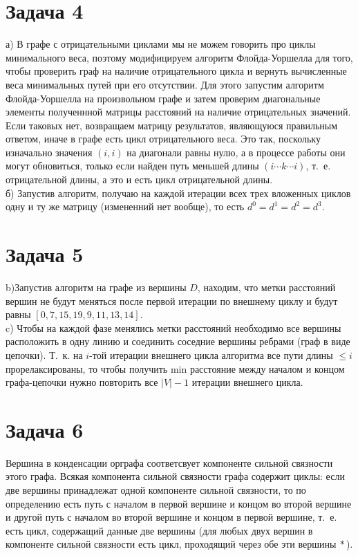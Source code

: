 \documentclass[a4paper,12pt]{article} %
\begin{document}
\section*{Задача 4}
а) В графе с отрицательными циклами мы не можем говорить про циклы минимального веса, поэтому модифицируем алгоритм Флойда-Уоршелла для того, чтобы проверить граф на наличие отрицательного цикла и вернуть вычисленные веса минимальных путей при его отсутствии. Для этого запустим алгоритм Флойда-Уоршелла на произвольном графе и затем проверим диагональные элементы полученнной матрицы расстояний на наличие отрицательных значений. Если таковых нет, возвращаем матрицу результатов, являющуюся правильным ответом, иначе в графе есть цикл отрицательного веса. Это так, поскольку изначально значения $(i, i)$ на диагонали равны нулю, а в процессе работы они могут обновиться, только если найден путь меньшей длины $(i\cdots k \cdots i)$, т.~е. отрицательной длины, а это и есть цикл отрицательной длины.\\

б) Запустив алгоритм, получаю на каждой итерации всех трех вложенных циклов одну и ту же матрицу (измененний нет вообще), то есть $d^{0}=d^{1}=d^{2}=d^{3}$.\\

\section*{Задача 5}  
b)Запустив алгоритм на графе из вершины $D$, находим, что метки расстояний вершин не будут меняться после первой итерации по внешнему циклу и будут равны $[0,  7,  15,  19,  9,  11,  13,  14 ] $.\\    

c) Чтобы на каждой фазе менялись метки расстояний необходимо все вершины расположить в одну линию и соединить соседние вершины ребрами (граф в виде цепочки). Т.~к. на $i$-той итерации внешнего цикла алгоритма все пути длины $\leq i$ прорелаксированы, то чтобы получить min расстояние между началом и концом графа-цепочки нужно повторить все $|V|-1$ итерации внешнего цикла.	\\


\section*{Задача 6}
Вершина в конденсации орграфа соответсвует компоненте сильной связности этого графа. Всякая компонента сильной связности графа содержит циклы: если две вершины принадлежат одной компоненте сильной связности, то по определению есть путь с началом в первой вершине и концом во второй вершине и другой путь с началом во второй вершине и концом в первой вершине, т.~е. есть цикл, содержащий данные две вершины (для любых двух вершин в компоненте сильной связности есть цикл, проходящий через обе эти вершины$~*$). \\   
\end{document}

